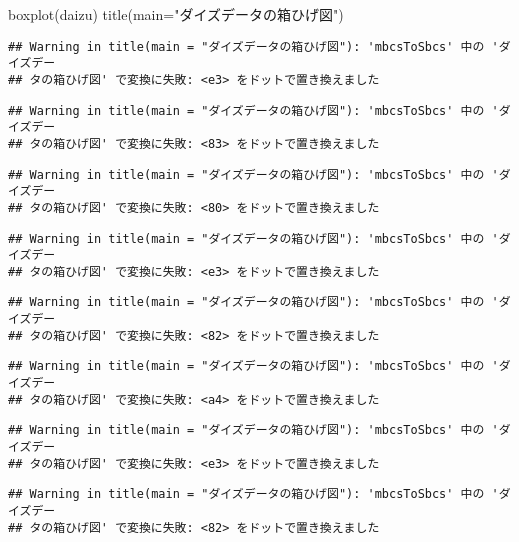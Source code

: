 \documentclass[
]{article}
\newenvironment{Shaded}{\begin{snugshade}}{\end{snugshade}}
\newcommand{\AttributeTok}[1]{\textcolor[rgb]{0.77,0.63,0.00}{#1}}
\newcommand{\FunctionTok}[1]{\textcolor[rgb]{0.00,0.00,0.00}{#1}}
\newcommand{\NormalTok}[1]{#1}
\newcommand{\StringTok}[1]{\textcolor[rgb]{0.31,0.60,0.02}{#1}}
\begin{document}
\begin{Shaded}
\begin{Highlighting}[]
    \FunctionTok{boxplot}\NormalTok{(daizu)}
    \FunctionTok{title}\NormalTok{(}\AttributeTok{main=}\StringTok{"ダイズデータの箱ひげ図"}\NormalTok{)}
\end{Highlighting}
\end{Shaded}

\begin{verbatim}
## Warning in title(main = "ダイズデータの箱ひげ図"): 'mbcsToSbcs' 中の 'ダイズデー
## タの箱ひげ図' で変換に失敗: <e3> をドットで置き換えました
\end{verbatim}

\begin{verbatim}
## Warning in title(main = "ダイズデータの箱ひげ図"): 'mbcsToSbcs' 中の 'ダイズデー
## タの箱ひげ図' で変換に失敗: <83> をドットで置き換えました
\end{verbatim}

\begin{verbatim}
## Warning in title(main = "ダイズデータの箱ひげ図"): 'mbcsToSbcs' 中の 'ダイズデー
## タの箱ひげ図' で変換に失敗: <80> をドットで置き換えました
\end{verbatim}

\begin{verbatim}
## Warning in title(main = "ダイズデータの箱ひげ図"): 'mbcsToSbcs' 中の 'ダイズデー
## タの箱ひげ図' で変換に失敗: <e3> をドットで置き換えました
\end{verbatim}

\begin{verbatim}
## Warning in title(main = "ダイズデータの箱ひげ図"): 'mbcsToSbcs' 中の 'ダイズデー
## タの箱ひげ図' で変換に失敗: <82> をドットで置き換えました
\end{verbatim}

\begin{verbatim}
## Warning in title(main = "ダイズデータの箱ひげ図"): 'mbcsToSbcs' 中の 'ダイズデー
## タの箱ひげ図' で変換に失敗: <a4> をドットで置き換えました
\end{verbatim}

\begin{verbatim}
## Warning in title(main = "ダイズデータの箱ひげ図"): 'mbcsToSbcs' 中の 'ダイズデー
## タの箱ひげ図' で変換に失敗: <e3> をドットで置き換えました
\end{verbatim}

\begin{verbatim}
## Warning in title(main = "ダイズデータの箱ひげ図"): 'mbcsToSbcs' 中の 'ダイズデー
## タの箱ひげ図' で変換に失敗: <82> をドットで置き換えました
\end{verbatim}
\end{document}
